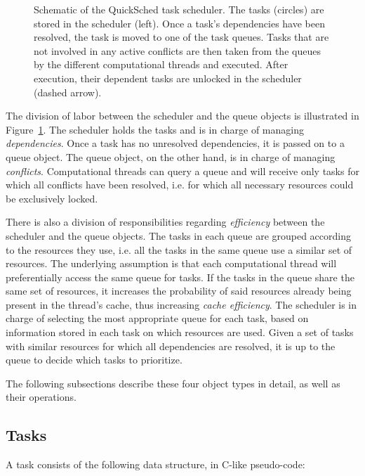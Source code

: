 \documentclass[preprint]{elsarticle}
\newcommand{\fig}[1]
    {Figure~\ref{fig:#1}}
\begin{document}
\begin{figure}
    \centerline{}
    \caption{Schematic of the QuickSched task scheduler.
        The tasks (circles) are stored in the scheduler (left).
        Once a task's dependencies have been resolved, the task
        is moved to one of the task queues.
        Tasks that are not involved in any active conflicts
        are then taken from the queues by the different
        computational threads and executed.
        After execution, their dependent tasks are unlocked
        in the scheduler (dashed arrow).}
    \label{fig:QSched}
\end{figure}

The division of labor between the scheduler and
the queue objects is illustrated in \fig{QSched}.
The scheduler holds the tasks and is in charge
of managing {\em dependencies}.
Once a task has no unresolved dependencies, it is passed
on to a queue object.
The queue object, on the other hand, is in charge
of managing {\em conflicts}.
Computational threads can query a queue and will
receive only tasks for which all conflicts have been
resolved, i.e. for which all necessary resources could be 
exclusively locked.

There is also a division of responsibilities regarding
{\em efficiency} between the scheduler and the queue
objects.
The tasks in each queue are grouped according to the resources
they use, i.e. all the tasks in the same queue use a
similar set of resources.
The underlying assumption is that each computational
thread will preferentially access the same queue for tasks.
If the tasks in the queue share the same set of resources,
it increases the probability of said resources already
being present in the thread's cache, thus increasing
{\em cache efficiency}.
The scheduler is in charge of selecting the most appropriate
queue for each task, based on information stored in each task
on which resources are used.
Given a set of tasks with similar resources for which all
dependencies are resolved, it is up to the queue to decide which
tasks to prioritize.

The following subsections describe these four object types
in detail, as well as their operations.


\subsection{Tasks}
\label{sec:tasks}

A task consists of the following data structure, in C-like pseudo-code:
\end{document}
